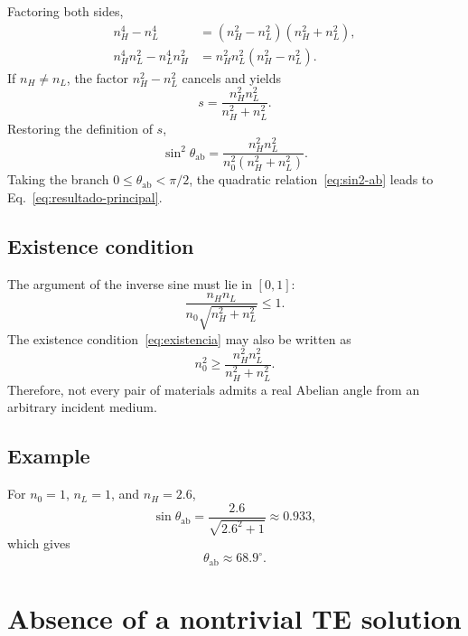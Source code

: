 \documentclass[10pt,a4paper]{article}
\begin{document}
Factoring both sides,
\begin{align}
n_H^4-n_L^4&=(n_H^2-n_L^2)(n_H^2+n_L^2),\\
n_H^4n_L^2-n_L^4n_H^2&=n_H^2n_L^2(n_H^2-n_L^2).
\end{align}
If $n_H\neq n_L$, the factor $n_H^2-n_L^2$ cancels and yields
\begin{equation}
s=\frac{n_H^2n_L^2}{n_H^2+n_L^2}.
\end{equation}
Restoring the definition of $s$,
\begin{equation}
\boxed{
\sin^2\theta_{\mathrm{ab}}
=
\frac{n_H^2n_L^2}{n_0^2(n_H^2+n_L^2)}.}
\label{eq:sin2-ab}
\end{equation}
Taking the branch $0\leq\theta_{\mathrm{ab}}<\pi/2$, the quadratic relation~\eqref{eq:sin2-ab} leads to Eq.~\eqref{eq:resultado-principal}.

\subsection*{Existence condition}

The argument of the inverse sine must lie in $[0,1]$:
\begin{equation}
\frac{n_Hn_L}{n_0\sqrt{n_H^2+n_L^2}}\leq1.
\label{eq:existencia}
\end{equation}
The existence condition~\eqref{eq:existencia} may also be written as
\begin{equation}
n_0^2\geq\frac{n_H^2n_L^2}{n_H^2+n_L^2}.
\end{equation}
Therefore, not every pair of materials admits a real Abelian angle from an arbitrary incident medium.

\subsection*{Example}

For $n_0=1$, $n_L=1$, and $n_H=2.6$,
\begin{equation}
\sin\theta_{\mathrm{ab}}
=\frac{2.6}{\sqrt{2.6^2+1}}
\approx0.933,
\end{equation}
which gives
\begin{equation}
\theta_{\mathrm{ab}}\approx68.9^{\circ}.
\end{equation}

\section{Absence of a nontrivial TE solution}
\end{document}
